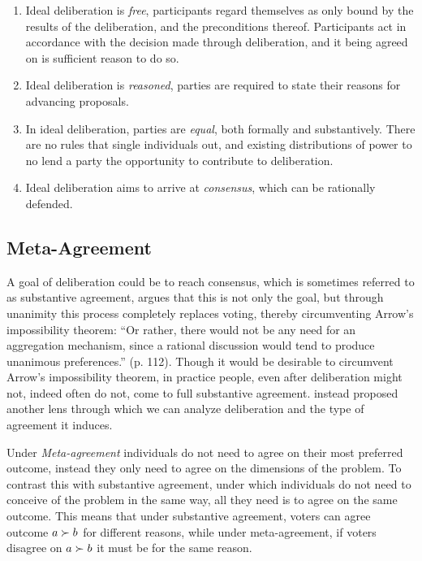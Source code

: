 \begin{enumerate}
	\label{list:ideal-deliberation}
	\setlength\itemsep{1px}
	\item  Ideal deliberation is \textit{free}, participants regard themselves as only bound by the results of the deliberation, and the preconditions thereof. Participants act in accordance with the decision made through deliberation, and it being agreed on is sufficient reason to do so.
	\item  Ideal deliberation is \textit{reasoned}, parties are required to state their reasons for advancing proposals.
	\item  In ideal deliberation, parties are \textit{equal}, both formally and substantively. There are no rules that single individuals out, and existing distributions of power to no lend a party the opportunity to contribute to deliberation.
	\item  Ideal deliberation aims to arrive at \textit{consensus}, which can be rationally defended.
\end{enumerate}

\subsection{Meta-Agreement}
\label{subsection:Meta-agreement}

A goal of deliberation could be to reach consensus, which is sometimes referred to as substantive agreement, \citet{elsterMARKETFORUMThree2002} argues that this is not only the goal, but through unanimity this process completely replaces voting, thereby circumventing Arrow's impossibility theorem: ``Or rather, there would not be any need for an aggregation mechanism, since a rational discussion would tend to produce unanimous preferences.” (p. 112). Though it would be desirable to circumvent Arrow's impossibility theorem, in practice people, even after deliberation might not, indeed often do not, come to full substantive agreement. \citet{listTwoConceptsAgreement2002} instead proposed another lens through which we can analyze deliberation and the type of agreement it induces.

Under \emph{Meta-agreement} individuals do not need to agree on their most preferred outcome, instead they only need to agree on the dimensions of the problem. To contrast this with substantive agreement, under which individuals do not need to conceive of the problem in the same way, all they need is to agree on the same outcome. This means that under substantive agreement, voters can agree outcome $a \succ b$ for different reasons, while under meta-agreement, if voters disagree on $a \succ b$ it must be for the same reason.

